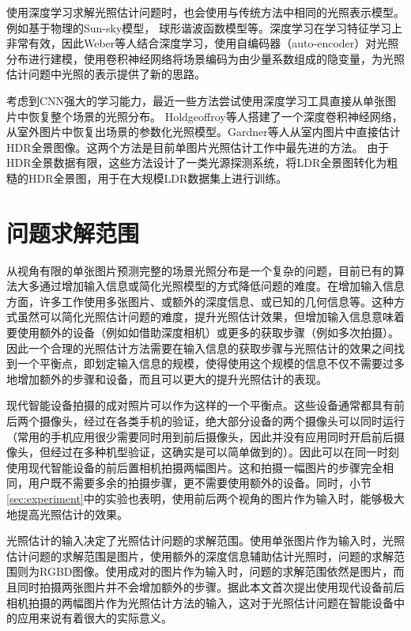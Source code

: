 使用深度学习求解光照估计问题时，也会使用与传统方法中相同的光照表示模型。例如基于物理的Sun-sky模型\cite{hold2017deep}， 球形谐波函数模型\cite{mandl2017learning}等。深度学习在学习特征学习上非常有效，因此Weber等人\cite{weber2018learning}结合深度学习，使用自编码器（auto-encoder）对光照分布进行建模，使用卷积神经网络将场景编码为由少量系数组成的隐变量，为光照估计问题中光照的表示提供了新的思路。

考虑到CNN强大的学习能力，最近一些方法尝试使用深度学习工具直接从单张图片中恢复整个场景的光照分布。
Holdgeoffroy等人\cite{hold2017deep}搭建了一个深度卷积神经网络，从室外图片中恢复出场景的参数化光照模型。Gardner等人\cite{gardner2017learning}从室内图片中直接估计HDR全景图像。这两个方法是目前单图片光照估计工作中最先进的方法。
由于HDR全景数据有限，这些方法设计了一类光源探测系统，将LDR全景图转化为粗糙的HDR全景图，用于在大规模LDR数据集上进行训练。

\section{问题求解范围}
从视角有限的单张图片预测完整的场景光照分布是一个复杂的问题，目前已有的算法大多通过增加输入信息或简化光照模型的方式降低问题的难度。在增加输入信息方面，许多工作使用多张图片、或额外的深度信息、或已知的几何信息等。这种方式虽然可以简化光照估计问题的难度，提升光照估计效果，但增加输入信息意味着要使用额外的设备（例如如借助深度相机）或更多的获取步骤（例如多次拍摄）。因此一个合理的光照估计方法需要在输入信息的获取步骤与光照估计的效果之间找到一个平衡点，即划定输入信息的规模，使得使用这个规模的信息不仅不需要过多地增加额外的步骤和设备，而且可以更大的提升光照估计的表现。

现代智能设备拍摄的成对照片可以作为这样的一个平衡点。这些设备通常都具有前后两个摄像头，经过在各类手机的验证，绝大部分设备的两个摄像头可以同时运行（常用的手机应用很少需要同时用到前后摄像头，因此并没有应用同时开启前后摄像头，但经过在多种机型验证，这确实是可以简单做到的）。因此可以在同一时刻使用现代智能设备的前后置相机拍摄两幅图片。这和拍摄一幅图片的步骤完全相同，用户既不需要多余的拍摄步骤，更不需要使用额外的设备。同时，小节\ref{sec:experiment}中的实验也表明，使用前后两个视角的图片作为输入时，能够极大地提高光照估计的效果。

光照估计的输入决定了光照估计问题的求解范围。使用单张图片作为输入时，光照估计问题的求解范围是图片，使用额外的深度信息辅助估计光照时，问题的求解范围则为RGBD图像。使用成对的图片作为输入时，问题的求解范围依然是图片，而且同时拍摄两张图片并不会增加额外的步骤。据此本文首次提出使用现代设备前后相机拍摄的两幅图片作为光照估计方法的输入，这对于光照估计问题在智能设备中的应用来说有着很大的实际意义。

